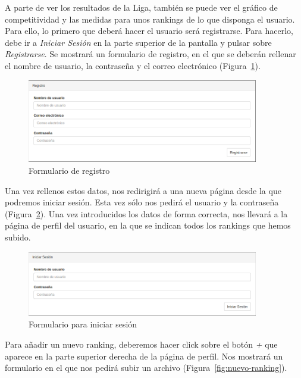 A parte de ver los resultados de la Liga, también se puede ver el gráfico de competitividad y las medidas para unos rankings de lo que disponga el usuario. Para ello, lo primero que deberá hacer el usuario será registrarse. Para hacerlo, debe ir a \emph{Iniciar Sesión} en la parte superior de la pantalla y pulsar sobre \emph{Registrarse}. Se mostrará un formulario de registro, en el que se deberán rellenar el nombre de usuario, la contraseña y el correo electrónico (Figura~\ref{fig:registro}).\\

\begin{figure}[htb]
\centering
\includegraphics[width=0.9\textwidth]{imagenes/pantallazos-aplicacion/registro}
\caption{Formulario de registro}
\label{fig:registro}
\end{figure}

Una vez rellenos estos datos, nos redirigirá a una nueva página desde la que podremos iniciar sesión. Esta vez sólo nos pedirá el usuario y la contraseña (Figura~\ref{fig:inicio-sesion}). Una vez introducidos los datos de forma correcta, nos llevará a la página de perfil del usuario, en la que se indican todos los rankings que hemos subido.

\begin{figure}[htb]
\centering
\includegraphics[width=0.9\textwidth]{imagenes/pantallazos-aplicacion/inicio-sesion}
\caption{Formulario para iniciar sesión}
\label{fig:inicio-sesion}
\end{figure}

Para añadir un nuevo ranking, deberemos hacer click sobre el botón \emph{+} que aparece en la parte superior derecha de la página de perfil. Nos mostrará un formulario en el que nos pedirá subir un archivo (Figura~\ref{fig:nuevo-ranking}). \\

